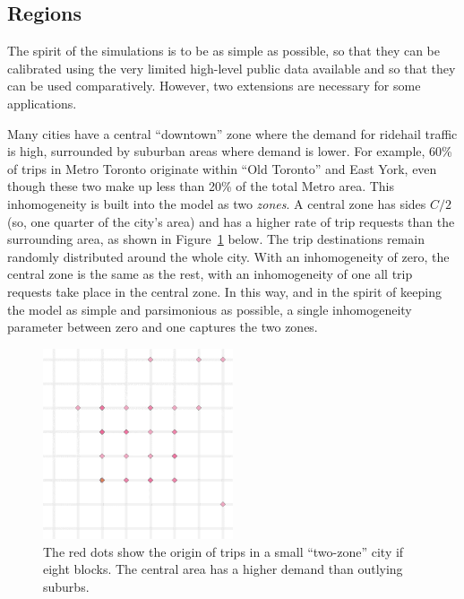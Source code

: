 \documentclass[
  letterpaper,
  DIV=11,
  numbers=noendperiod]{scrartcl}
\begin{document}
\hypertarget{extensions}{%
\subsection{Regions}\label{extensions}}

The spirit of the simulations is to be as simple as possible, so that
they can be calibrated using the very limited high-level public data
available and so that they can be used comparatively. However, two
extensions are necessary for some applications.

Many cities have a central ``downtown'' zone where the demand for
ridehail traffic is high, surrounded by suburban areas where demand is
lower. For example, 60\% of trips in Metro Toronto originate within
``Old Toronto'' and East York, even though these two make up less than
20\% of the total Metro area. This inhomogeneity is built into the model
as two \emph{zones}. A central zone has sides \(C/2\) (so, one quarter
of the city's area) and has a higher rate of trip requests than the
surrounding area, as shown in Figure~\ref{fig-3} below. The trip
destinations remain randomly distributed around the whole city. With an
inhomogeneity of zero, the central zone is the same as the rest, with an
inhomogeneity of one all trip requests take place in the central zone.
In this way, and in the spirit of keeping the model as simple and
parsimonious as possible, a single inhomogeneity parameter between zero
and one captures the two zones.

\begin{figure}

{\centering \includegraphics[width=0.5\textwidth,height=\textheight]{fig3.png}

}

\caption{\label{fig-3}The red dots show the origin of trips in a small
``two-zone'' city if eight blocks. The central area has a higher demand
than outlying suburbs.}

\end{figure}
\end{document}
